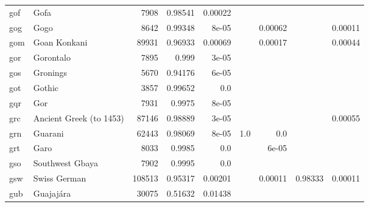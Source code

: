 \documentclass[11pt]{article}
\begin{document}
\begin{table*}[h]
{\begin{tabular}{llrrrrrrr}
gof         & Gofa         & 7908         & 0.98541         & 0.00022         &          &          &          &          \\

gog         & Gogo         & 8642         & 0.99348         & 8e-05         &          & 0.00062         &          & 0.00011         \\

gom         & Goan Konkani         & 89931         & 0.96933         & 0.00069         &          & 0.00017         &          & 0.00044         \\

gor         & Gorontalo         & 7895         & 0.999         & 3e-05         &          &          &          &          \\

gos         & Gronings         & 5670         & 0.94176         & 6e-05         &          &          &          &          \\

got         & Gothic         & 3857         & 0.99652         & 0.0         &          &          &          &          \\

gqr         & Gor         & 7931         & 0.9975         & 8e-05         &          &          &          &          \\

grc         & Ancient Greek (to 1453)         & 87146         & 0.98889         & 3e-05         &          &          &          & 0.00055         \\

grn         & Guarani         & 62443         & 0.98069         & 8e-05         & 1.0         & 0.0         &          &          \\

grt         & Garo         & 8033         & 0.9985         & 0.0         &          & 6e-05         &          &          \\

gso         & Southwest Gbaya         & 7902         & 0.9995         & 0.0         &          &          &          &          \\

gsw         & Swiss German         & 108513         & 0.95317         & 0.00201         &          & 0.00011         & 0.98333         & 0.00011         \\

gub         & Guajajára         & 30075         & 0.51632         & 0.01438         &          &          &          &          \\


\end{tabular}}
\end{table*}
\end{document}

